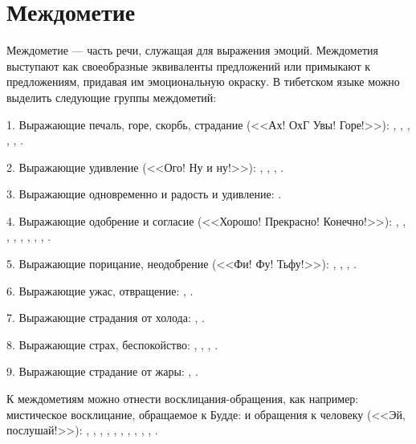 \section{Междометие}

Междометие --- часть речи, служащая для выражения эмоций. Междометия выступают как своеобразные эквиваленты предложений или примыкают к предложениям, придавая им эмоциональную окраску. В тибетском языке можно выделить следующие группы междометий:

1. Выражающие печаль, горе, скорбь, страдание (<<Ах! ОхГ Увы! Горе!>>):
,
,
,
,
,
.

2. Выражающие удивление (<<Ого! Ну и ну!>>):
,
,
,
.

3. Выражающие одновременно и радость и удивление: .

4. Выражающие одобрение и согласие (<<Хорошо! Прекрасно! Конечно!>>):
,
,
,
,
,
,
,
,
.

5. Выражающие порицание, неодобрение (<<Фи! Фу! Тьфу!>>):
,
,
,
.

6. Выражающие ужас, отвращение:
,
.

7. Выражающие страдания от холода:
,
.

8. Выражающие страх, беспокойство:
,
,
,
.

9. Выражающие страдание от жары:
,
.

К междометиям можно отнести восклицания-обращения, как например: мистическое восклицание, обращаемое к Будде:  и обращения к человеку (<<Эй, послушай!>>):
,
,
,
,
,
,
,
,
,
,
.
